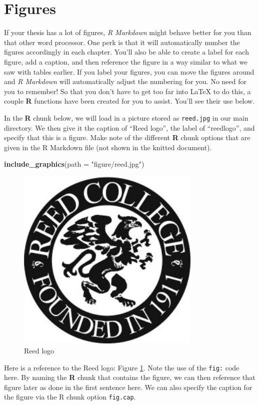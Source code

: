 \documentclass[12pt,twoside]{reedthesis}
\newenvironment{Shaded}{\begin{snugshade}}{\end{snugshade}}
\newcommand{\KeywordTok}[1]{\textcolor[rgb]{0.13,0.29,0.53}{\textbf{#1}}}
\newcommand{\DataTypeTok}[1]{\textcolor[rgb]{0.13,0.29,0.53}{#1}}
\newcommand{\StringTok}[1]{\textcolor[rgb]{0.31,0.60,0.02}{#1}}
\newcommand{\NormalTok}[1]{#1}
\theoremstyle{definition}
\theoremstyle{definition}
\theoremstyle{definition}
\theoremstyle{remark}
\begin{document}
\clearpage

\section{Figures}\label{figures}

If your thesis has a lot of figures, \emph{R Markdown} might behave
better for you than that other word processor. One perk is that it will
automatically number the figures accordingly in each chapter. You'll
also be able to create a label for each figure, add a caption, and then
reference the figure in a way similar to what we saw with tables
earlier. If you label your figures, you can move the figures around and
\emph{R Markdown} will automatically adjust the numbering for you. No
need for you to remember! So that you don't have to get too far into
LaTeX to do this, a couple \textbf{R} functions have been created for
you to assist. You'll see their use below.

In the \textbf{R} chunk below, we will load in a picture stored as
\texttt{reed.jpg} in our main directory. We then give it the caption of
``Reed logo'', the label of ``reedlogo'', and specify that this is a
figure. Make note of the different \textbf{R} chunk options that are
given in the R Markdown file (not shown in the knitted document).
\begin{Shaded}
\begin{Highlighting}[]
\KeywordTok{include_graphics}\NormalTok{(}\DataTypeTok{path =} \StringTok{"figure/reed.jpg"}\NormalTok{)}
\end{Highlighting}
\end{Shaded}
\begin{figure}
\includegraphics[width=3.47in]{figure/reed} \caption{Reed logo}\label{fig:reedlogo}
\end{figure}
Here is a reference to the Reed logo: Figure \ref{fig:reedlogo}. Note
the use of the \texttt{fig:} code here. By naming the \textbf{R} chunk
that contains the figure, we can then reference that figure later as
done in the first sentence here. We can also specify the caption for the
figure via the R chunk option \texttt{fig.cap}.
\end{document}
